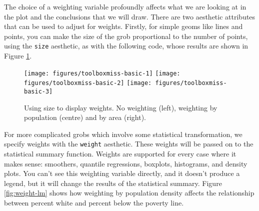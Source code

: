 The choice of a weighting variable profoundly affects what we are
looking at in the plot and the conclusions that we will draw. There are
two aesthetic attributes that can be used to adjust for weights.
Firstly, for simple geoms like lines and points, you can make the size
of the grob proportional to the number of points, using the
\texttt{size} aesthetic, as with the following code, whose results are
shown in Figure \ref{fig:miss-basic}.

\begin{Shaded}
\begin{Highlighting}[]
 
 
   \StringTok{ }\NormalTok{) +}\StringTok{ }\NormalTok{(}\NormalTok{, }
   \NormalTok{(}\NormalTok{, }\NormalTok{, }\NormalTok{, }\NormalTok{))}
  \StringTok{ }
\StringTok{  }\NormalTok{()}
\end{Highlighting}
\end{Shaded}

\begin{figure}

{\centering \texttt{[image: figures/toolboxmiss-basic-1]} \texttt{[image: figures/toolboxmiss-basic-2]} \texttt{[image: figures/toolboxmiss-basic-3]} 

}

\caption{Using size to display weights. No weighting (left), weighting by population (centre) and by area (right).\label{fig:miss-basic}}
\end{figure}

For more complicated grobs which involve some statistical
transformation, we specify weights with the \texttt{weight} aesthetic.
These weights will be passed on to the statistical summary function.
Weights are supported for every case where it makes sense: smoothers,
quantile regressions, boxplots, histograms, and density plots. You can't
see this weighting variable directly, and it doesn't produce a legend,
but it will change the results of the statistical summary. Figure
\ref{fig:weight-lm} shows how weighting by population density affects
the relationship between percent white and percent below the poverty
line.

